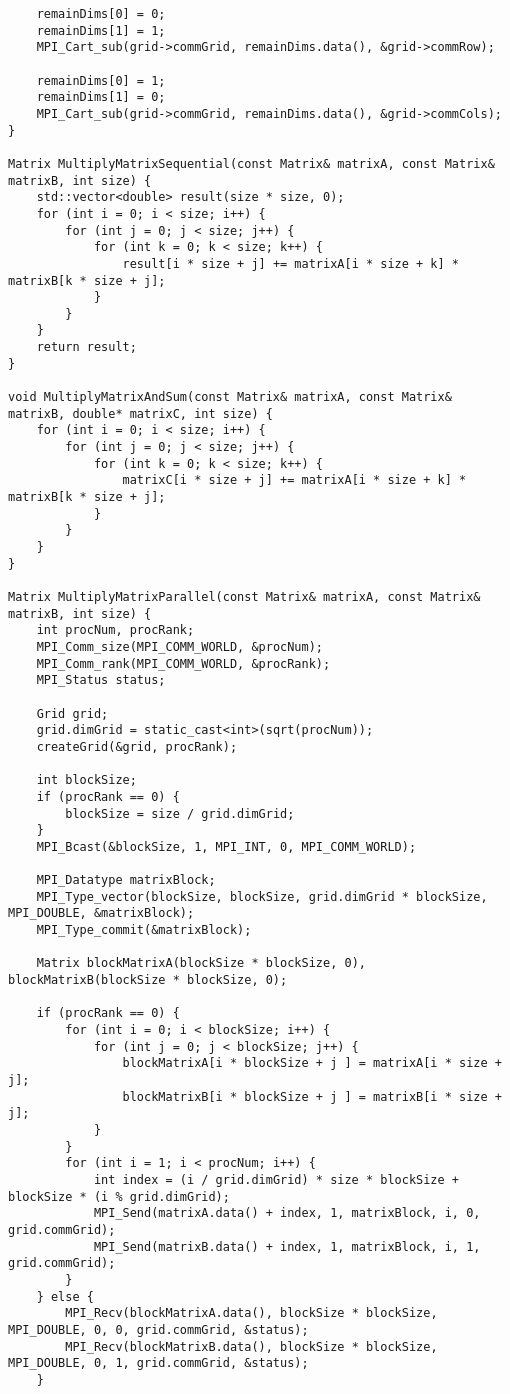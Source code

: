 \documentclass{report}
\begin{document}
\begin{lstlisting}
    remainDims[0] = 0;
    remainDims[1] = 1;
    MPI_Cart_sub(grid->commGrid, remainDims.data(), &grid->commRow);

    remainDims[0] = 1;
    remainDims[1] = 0;
    MPI_Cart_sub(grid->commGrid, remainDims.data(), &grid->commCols);
}

Matrix MultiplyMatrixSequential(const Matrix& matrixA, const Matrix& matrixB, int size) {
    std::vector<double> result(size * size, 0);
    for (int i = 0; i < size; i++) {
        for (int j = 0; j < size; j++) {
            for (int k = 0; k < size; k++) {
                result[i * size + j] += matrixA[i * size + k] * matrixB[k * size + j];
            }
        }
    }
    return result;
}

void MultiplyMatrixAndSum(const Matrix& matrixA, const Matrix& matrixB, double* matrixC, int size) {
    for (int i = 0; i < size; i++) {
        for (int j = 0; j < size; j++) {
            for (int k = 0; k < size; k++) {
                matrixC[i * size + j] += matrixA[i * size + k] * matrixB[k * size + j];
            }
        }
    }
}

Matrix MultiplyMatrixParallel(const Matrix& matrixA, const Matrix& matrixB, int size) {
    int procNum, procRank;
    MPI_Comm_size(MPI_COMM_WORLD, &procNum);
    MPI_Comm_rank(MPI_COMM_WORLD, &procRank);
    MPI_Status status;

    Grid grid;
    grid.dimGrid = static_cast<int>(sqrt(procNum));
    createGrid(&grid, procRank);

    int blockSize;
    if (procRank == 0) {
        blockSize = size / grid.dimGrid;
    }
    MPI_Bcast(&blockSize, 1, MPI_INT, 0, MPI_COMM_WORLD);

    MPI_Datatype matrixBlock;
    MPI_Type_vector(blockSize, blockSize, grid.dimGrid * blockSize, MPI_DOUBLE, &matrixBlock);
    MPI_Type_commit(&matrixBlock);

    Matrix blockMatrixA(blockSize * blockSize, 0), blockMatrixB(blockSize * blockSize, 0);

    if (procRank == 0) {
        for (int i = 0; i < blockSize; i++) {
            for (int j = 0; j < blockSize; j++) {
                blockMatrixA[i * blockSize + j ] = matrixA[i * size + j];
                blockMatrixB[i * blockSize + j ] = matrixB[i * size + j];
            }
        }
        for (int i = 1; i < procNum; i++) {
            int index = (i / grid.dimGrid) * size * blockSize + blockSize * (i % grid.dimGrid);
            MPI_Send(matrixA.data() + index, 1, matrixBlock, i, 0, grid.commGrid);
            MPI_Send(matrixB.data() + index, 1, matrixBlock, i, 1, grid.commGrid);
        }
    } else {
        MPI_Recv(blockMatrixA.data(), blockSize * blockSize, MPI_DOUBLE, 0, 0, grid.commGrid, &status);
        MPI_Recv(blockMatrixB.data(), blockSize * blockSize, MPI_DOUBLE, 0, 1, grid.commGrid, &status);
    }


\end{lstlisting}
\end{document}
